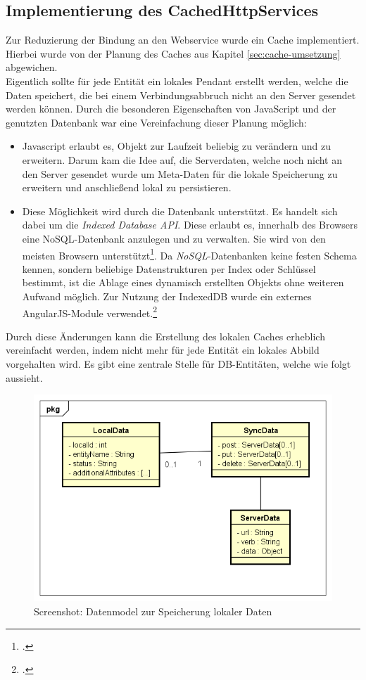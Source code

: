 \subsection{Implementierung des CachedHttpServices}
\label{ssec:Implementierung-cachedHttpService}
Zur Reduzierung der Bindung an den Webservice wurde ein Cache implementiert. Hierbei wurde von der Planung des Caches aus Kapitel \ref{sec:cache-umsetzung} abgewichen. \\
Eigentlich sollte für jede Entität ein lokales Pendant erstellt werden, welche die Daten speichert, die bei einem Verbindungsabbruch nicht an den Server gesendet werden können. Durch die besonderen Eigenschaften von JavaScript und der genutzten Datenbank war eine Vereinfachung dieser Planung möglich:
\begin{itemize}
\item Javascript erlaubt es, Objekt zur Laufzeit beliebig zu verändern und zu erweitern. Darum kam die Idee auf, die Serverdaten, welche noch nicht an den Server gesendet wurde um Meta-Daten für die lokale Speicherung zu erweitern und anschließend lokal zu persistieren.
\item Diese Möglichkeit wird durch die Datenbank unterstützt. Es handelt sich dabei um die \textit{Indexed Database API}. Diese erlaubt es, innerhalb des Browsers eine \ac{NoSQL}-Datenbank anzulegen und zu verwalten. Sie wird von den meisten Browsern unterstützt\footcite{online:caniuse:indexedDB}. Da \textit{NoSQL}-Datenbanken keine festen Schema kennen, sondern beliebige Datenstrukturen per Index oder Schlüssel bestimmt, ist die Ablage eines dynamisch erstellten Objekts ohne weiteren Aufwand möglich. Zur Nutzung der IndexedDB wurde ein externes AngularJS-Module verwendet.\footcite{online:AngularJs:indexedDB}
\end{itemize}  
Durch diese Änderungen kann die Erstellung des lokalen Caches erheblich vereinfacht werden, indem nicht mehr für jede Entität ein lokales Abbild vorgehalten wird. Es gibt eine zentrale Stelle für DB-Entitäten, welche wie folgt aussieht.

\begin{figure}[h]
\centering
\includegraphics[width=0.8\linewidth]{content/images/DataModel-Cache-SPA}
\caption{Screenshot: Datenmodel zur Speicherung lokaler Daten}
\label{pic:DataModel-Cache-SPA}
\end{figure}

